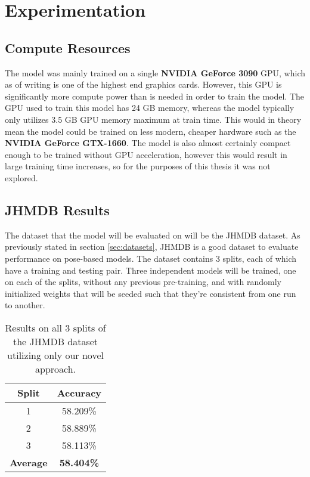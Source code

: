 
\chapter{Experimentation} %

\label{Experimentation} %

\section{Compute Resources}

The model was mainly trained on a single \textbf{NVIDIA GeForce 3090} GPU, which as of writing is one of the highest end graphics cards. However, this GPU is significantly more compute power than is needed in order to train the model. The GPU used to train this model has 24 GB memory, whereas the model typically only utilizes 3.5 GB GPU memory maximum at train time. This would in theory mean the model could be trained on less modern, cheaper hardware such as the \textbf{NVIDIA GeForce GTX-1660}. The model is also almost certainly compact enough to be trained without GPU acceleration, however this would result in large training time increases, so for the purposes of this thesis it was not explored.

\section{JHMDB Results}
\label{sec:JHMDBResults}

The dataset that the model will be evaluated on will be the JHMDB dataset. As previously stated in section \ref{sec:datasets}, JHMDB is a good dataset to evaluate performance on pose-based models. The dataset contains 3 splits, each of which have a training and testing pair. Three independent models will be trained, one on each of the splits, without any previous pre-training, and with randomly initialized weights that will be seeded such that they're consistent from one run to another.

\begin{table}[ht]
	\centering
	\begin{tabular}{||c c||} 
		\hline
		\textbf{Split} & \textbf{Accuracy} \\ [0.5ex] 
		\hline\hline
		1 & 58.209\% \\ 
		\hline
		2 & 58.889\% \\
		\hline
		3 & 58.113\% \\
		\hline
		\hline
		\textbf{Average} & \textbf{58.404\%} \\
		\hline
	\end{tabular}
	\caption{Results on all 3 splits of the JHMDB dataset utilizing only our novel approach.}
	\label{tab:acc-results}
\end{table}

